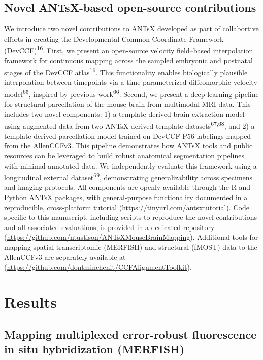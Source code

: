\documentclass[
  12pt,
]{article}
\begin{document}
\subsection{Novel ANTsX-based open-source
contributions}\label{novel-antsx-based-open-source-contributions}

We introduce two novel contributions to ANTsX developed as part of
collabortive efforts in creating the Developmental Common Coordinate
Framework (DevCCF)\textsuperscript{16}. First, we present an open-source
velocity field--based interpolation framework for continuous mapping
across the sampled embryonic and postnatal stages of the DevCCF
atlas\textsuperscript{16}. This functionality enables biologically
plausible interpolation between timepoints via a time-parameterized
diffeomorphic velocity model\textsuperscript{65}, inspired by previous
work\textsuperscript{66}. Second, we present a deep learning pipeline
for structural parcellation of the mouse brain from multimodal MRI data.
This includes two novel components: 1) a template-derived brain
extraction model using augmented data from two ANTsX-derived template
datasets\textsuperscript{67,68}, and 2) a template-derived parcellation
model trained on DevCCF P56 labelings mapped from the AllenCCFv3. This
pipeline demonstrates how ANTsX tools and public resources can be
leveraged to build robust anatomical segmentation pipelines with minimal
annotated data. We independently evaluate this framework using a
longitudinal external dataset\textsuperscript{69}, demonstrating
generalizability across specimens and imaging protocols. All components
are openly available through the R and Python ANTsX packages, with
general-purpose functionality documented in a reproducible,
cross-platform tutorial (\url{https://tinyurl.com/antsxtutorial}). Code
specific to this manuscript, including scripts to reproduce the novel
contributions and all associated evaluations, is provided in a dedicated
repository (\url{https://github.com/ntustison/ANTsXMouseBrainMapping}).
Additional tools for mapping spatial transcriptomic (MERFISH) and
structural (fMOST) data to the AllenCCFv3 are separately available at
(\url{https://github.com/dontminchenit/CCFAlignmentToolkit}).

\clearpage
\newpage

\section{Results}\label{results}

\subsection{Mapping multiplexed error-robust fluorescence in situ
hybridization
(MERFISH)}\label{mapping-multiplexed-error-robust-fluorescence-in-situ-hybridization-merfish}
\end{document}
